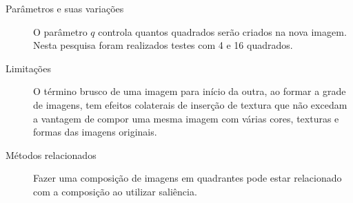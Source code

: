 \begin{description}
  \item[Parâmetros e suas variações] O parâmetro $q$ controla quantos quadrados serão criados na nova imagem. Nesta pesquisa foram realizados testes com 4 e 16 quadrados.

  \item[Limitações] O término brusco de uma imagem para início da outra, ao formar a grade de imagens, tem efeitos colaterais de inserção de textura que não excedam a vantagem de compor uma mesma imagem com várias cores, texturas e formas das imagens originais.

  \item[Métodos relacionados] Fazer uma composição de imagens em quadrantes pode estar relacionado com a composição ao utilizar saliência.

\end{description}
%

